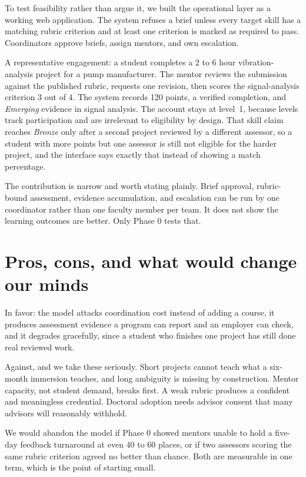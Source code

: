 \documentclass[10pt,letterpaper]{article}
\begin{document}
To test feasibility rather than argue it, we built the operational layer as a working web application.
The system refuses a brief unless every target skill has a matching rubric criterion and at least one
criterion is marked as required to pass. Coordinators approve briefs, assign mentors, and own
escalation.

A representative engagement: a student completes a 2 to 6 hour vibration-analysis project for a pump
manufacturer. The mentor reviews the submission against the published rubric, requests one revision,
then scores the signal-analysis criterion 3 out of 4. The system records 120 points, a verified
completion, and \textit{Emerging} evidence in signal analysis. The account stays at level~1, because
levels track participation and are irrelevant to eligibility by design. That skill claim reaches
\textit{Bronze} only after a second project reviewed by a different assessor, so a student with more
points but one assessor is still not eligible for the harder project, and the interface says exactly
that instead of showing a match percentage.

The contribution is narrow and worth stating plainly. Brief approval, rubric-bound assessment, evidence
accumulation, and escalation can be run by one coordinator rather than one faculty member per team. It
does not show the learning outcomes are better. Only Phase 0 tests that.

\section{Pros, cons, and what would change our minds}

In favor: the model attacks coordination cost instead of adding a course, it produces assessment
evidence a program can report and an employer can check, and it degrades gracefully, since a student
who finishes one project has still done real reviewed work.

Against, and we take these seriously. Short projects cannot teach what a six-month immersion teaches,
and long ambiguity is missing by construction. Mentor capacity, not student demand, breaks first. A weak
rubric produces a confident and meaningless credential. Doctoral adoption needs advisor consent that
many advisors will reasonably withhold.

We would abandon the model if Phase 0 showed mentors unable to hold a five-day feedback turnaround at
even 40 to 60 places, or if two assessors scoring the same rubric criterion agreed no better than
chance. Both are measurable in one term, which is the point of starting small.
\end{document}
